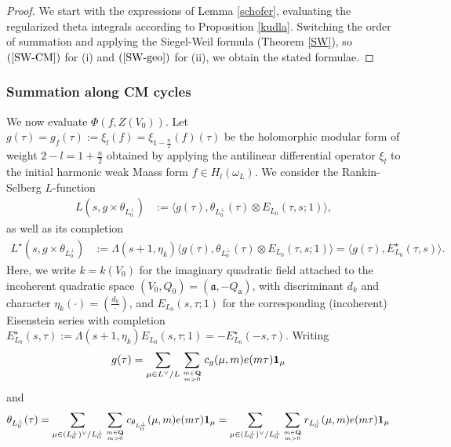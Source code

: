 \documentclass{amsart}
\theoremstyle{definition}
\theoremstyle{definition}
\theoremstyle{definition}
\begin{document}
\begin{proof} 

We start with the expressions of Lemma \ref{schofer}, evaluating the regularized theta integrals according to Proposition \ref{kudla}.
Switching the order of summation and applying the Siegel-Weil formula (Theorem \ref{SW}), so $(\ref{SW-CM})$ for (i) and $(\ref{SW-geo})$ for (ii),
we obtain the stated formulae. \end{proof}

\subsubsection{Summation along CM cycles}

We now evaluate $\Phi(f, Z(V_0))$. Let $g(\tau) = g_f(\tau) := \xi_{l}(f) = \xi_{1-\frac{n}{2}}(f)(\tau)$ 
be the holomorphic modular form of weight $2 - l = 1 + \frac{n}{2}$ obtained by applying the antilinear 
differential operator $\xi_l$ to the initial harmonic weak Maass form $f \in H_l(\omega_L)$. 
We consider the Rankin-Selberg $L$-function 
\begin{align*} L(s, g \times \theta_{L_0^{\perp}}) &:= \langle g(\tau), \theta_{L_0^{\perp}}(\tau) \otimes E_{L_0}(\tau, s; 1)  \rangle, \end{align*}
as well as its completion 
\begin{align*} L^{\star}(s, g \times \theta_{L_0^{\perp}}) &:= \Lambda(s+1, \eta_k)
\langle g(\tau), \theta_{L_0^{\perp}}(\tau) \otimes E_{L_0}(\tau, s; 1)  \rangle 
= \langle g(\tau), E^{\star}_{L_0}(\tau, s) \rangle. \end{align*}
Here, we write $k = k(V_0)$ for the imaginary quadratic field attached to the incoherent quadratic space $(V_0, Q_0) = (\mathfrak{a}, -Q_{\mathfrak{a}})$,
with discriminant $d_k$ and character $\eta_k(\cdot) = \left( \frac{d_k}{\cdot} \right)$, and $E_{L_0}(s, \tau; 1)$ for the corresponding (incoherent) Eisenstein series with completion
$E_{L_0}^{\star}(s, \tau) := \Lambda (s+1, \eta_k) E_{L_0}(s, \tau; 1) = - E_{L_0}^{\star}(-s, \tau)$. 
Writing 
\begin{align*} g(\tau) &= \sum\limits_{ \mu \in L^{\vee}/L } \sum\limits_{  m \in {\bf{Q}} \atop  m > 0} 
c_g(\mu, m) e(m \tau) {\bf{1}}_{\mu} \end{align*}
and 
\begin{align*} \theta_{L_0^{\perp}}(\tau) 
&= \sum\limits_{ \mu \in (L_0^{\perp})^{\vee}/L_0^{\perp}  } \sum\limits_{ m \in {\bf{Q}} \atop m >0  } 
c_{\theta_{L_0^{\perp}}}(\mu, m) e(m \tau) {\bf{1}}_{\mu}
= \sum\limits_{ \mu \in (L_0^{\perp})^{\vee}/L_0^{\perp}  } \sum\limits_{ m \in {\bf{Q}} \atop m >0  } 
r_{L_0^{\perp}}(\mu, m) e(m \tau) {\bf{1}}_{\mu} \end{align*}
\end{document}
